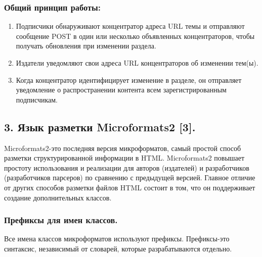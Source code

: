 \hypertarget{ux43eux431ux449ux438ux439-ux43fux440ux438ux43dux446ux438ux43f-ux440ux430ux431ux43eux442ux44b-1}{%
\subsubsection{Общий принцип
работы:}\label{ux43eux431ux449ux438ux439-ux43fux440ux438ux43dux446ux438ux43f-ux440ux430ux431ux43eux442ux44b-1}}

\begin{enumerate}
\def\labelenumi{\arabic{enumi}.}
\tightlist
\item
  Подписчики обнаруживают концентратор адреса URL темы и отправляют
  сообщение POST в один или несколько объявленных концентраторов, чтобы
  получать обновления при изменении раздела.
\item
  Издатели уведомляют свои адреса URL концентраторов об изменении
  тем(ы).
\item
  Когда концентратор идентифицирует изменение в разделе, он отправляет
  уведомление о распространении контента всем зарегистрированным
  подписчикам.
\end{enumerate}

\hypertarget{3-ux44fux437ux44bux43a-ux440ux430ux437ux43cux435ux442ux43aux438-microformats2-3}{%
\subsection{3. Язык разметки Microformats2
{[}3{]}.}\label{3-ux44fux437ux44bux43a-ux440ux430ux437ux43cux435ux442ux43aux438-microformats2-3}}

Microformats2-это последняя версия микроформатов, самый простой способ
разметки структурированной информации в HTML. Microformats2 повышает
простоту использования и реализации для авторов (издателей) и
разработчиков (разработчиков парсеров) по сравнению с предыдущей
версией. Главное отличие от других способов разметки файлов HTML состоит
в том, что он поддерживает создание дополнительных классов.

\hypertarget{ux43fux440ux435ux444ux438ux43aux441ux44b-ux434ux43bux44f-ux438ux43cux435ux43d-ux43aux43bux430ux441ux441ux43eux432}{%
\subsubsection{Префиксы для имен
классов.}\label{ux43fux440ux435ux444ux438ux43aux441ux44b-ux434ux43bux44f-ux438ux43cux435ux43d-ux43aux43bux430ux441ux441ux43eux432}}

Все имена классов микроформатов используют префиксы. Префиксы-это
синтаксис, независимый от словарей, которые разрабатываются отдельно.

